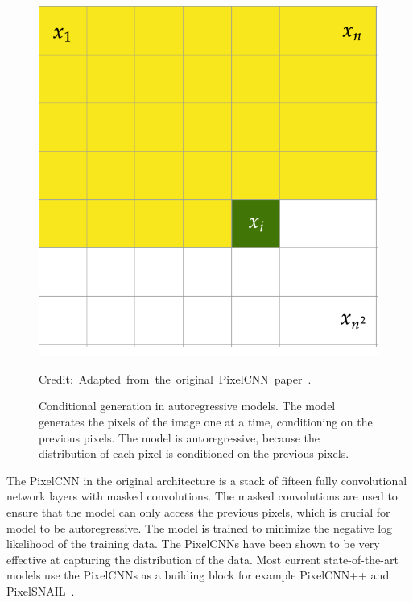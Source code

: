 \begin{figure}
    \centering 
    \includegraphics[scale=0.20]{figures/pixelcnn.png}
    \caption[Conditional generation in autoregressive models]%
    {Conditional generation in autoregressive models. The model generates the pixels of the image one at a time, conditioning on the previous pixels. The model is autoregressive, because the distribution of each pixel is conditioned on the previous pixels.}
  	\medskip 
    \hspace*{15pt}\hbox{\scriptsize Credit: Adapted from the original PixelCNN paper~\cite{pixelcnn}.}\label{PixelCNNFigure}
\end{figure}

The PixelCNN in the original architecture is a stack of fifteen fully convolutional network layers with masked convolutions. The masked convolutions are used to ensure that the model can only access the previous pixels, which is crucial for model to be autoregressive. The model is trained to minimize the negative log likelihood of the training data. The PixelCNNs have been shown to be very effective at capturing the distribution of the data. Most current state-of-the-art models use the PixelCNNs as a building block for example PixelCNN++ and PixelSNAIL~\cite{pixelcnn, pixelcnnpp,pixelsnail}.

